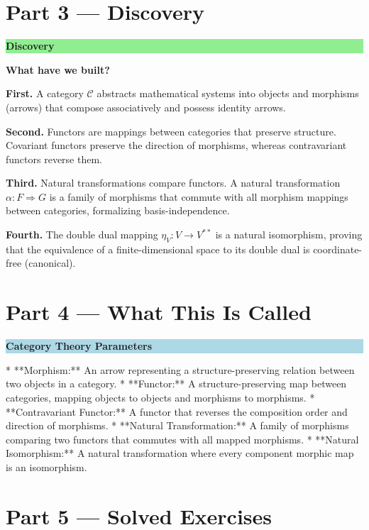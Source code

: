 \documentclass[12pt, a4paper]{article}
\newenvironment{discoverybox}
  {\par\medskip\fillcolorbox{LightGreen}{DiscoveryColor}{Discovery}}
  {\par\medskip}
\newenvironment{namedconcept}[1]
  {\par\medskip\fillcolorbox{LightBlue}{NavyBlue}{#1}}
  {\par\medskip}
\newcommand{\fillcolorbox}[3]{%
  \noindent
  \filldrawbox{#1}{#2}{\textbf{\sffamily\color{white}#3}}\par\nobreak\vspace{4pt}
}
\newcommand{\filldrawbox}[3]{%
  \colorbox{#1}{\parbox{\dimexpr\linewidth-2\fboxsep\relax}{%
    \vspace{4pt}\noindent\hspace{4pt}#3\vspace{4pt}%
  }}%
}
\begin{document}
\newpage

\section{Part 3 --- Discovery}

\begin{discoverybox}
\textbf{What have we built?}

\textbf{First.} A category $\mathcal{C}$ abstracts mathematical systems into objects and morphisms (arrows) that compose associatively and possess identity arrows.

\textbf{Second.} Functors are mappings between categories that preserve structure. Covariant functors preserve the direction of morphisms, whereas contravariant functors reverse them.

\textbf{Third.} Natural transformations compare functors. A natural transformation $\alpha: F \Rightarrow G$ is a family of morphisms that commute with all morphism mappings between categories, formalizing basis-independence.

\textbf{Fourth.} The double dual mapping $\eta_V: V \to V^{**}$ is a natural isomorphism, proving that the equivalence of a finite-dimensional space to its double dual is coordinate-free (canonical).
\end{discoverybox}

\newpage

\section{Part 4 --- What This Is Called}

\begin{namedconcept}{Category Theory Parameters}
* **Morphism:** An arrow representing a structure-preserving relation between two objects in a category.
* **Functor:** A structure-preserving map between categories, mapping objects to objects and morphisms to morphisms.
* **Contravariant Functor:** A functor that reverses the composition order and direction of morphisms.
* **Natural Transformation:** A family of morphisms comparing two functors that commutes with all mapped morphisms.
* **Natural Isomorphism:** A natural transformation where every component morphic map is an isomorphism.
\end{namedconcept}

\newpage

\section{Part 5 --- Solved Exercises}
\end{document}
